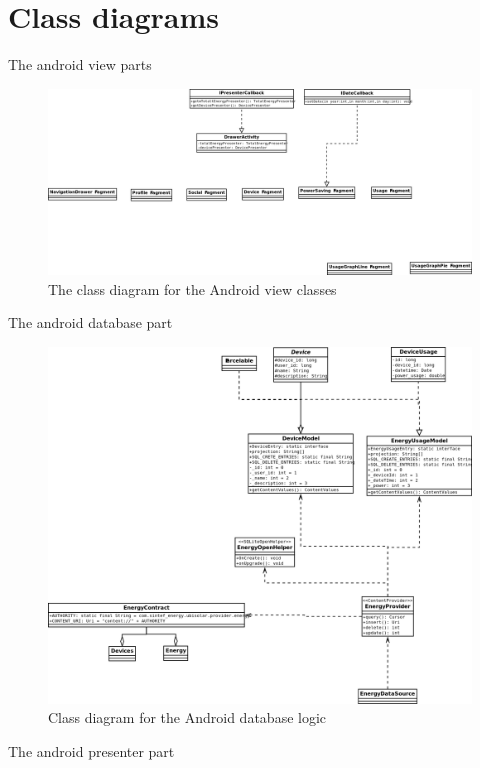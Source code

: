 \section{Class diagrams}

The android view parts
\begin{figure}[H]
\includegraphics[width=\textwidth]{ch/implementation/fig/ClassDiagramAndroid.png}
\caption{The class diagram for the Android view classes}
\end{figure}

The android database part
\begin{figure}[H]
\includegraphics[width=\textwidth]{ch/implementation/fig/classDiagramAndroidDatabase.png}
\caption{Class diagram for the Android database logic}
\end{figure}

The android presenter part

